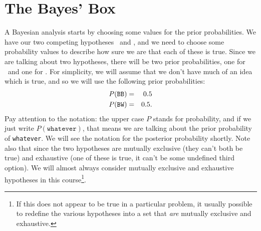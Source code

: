 \section{The Bayes' Box}
A Bayesian analysis starts by choosing some values for the prior probabilities.
We have our two competing hypotheses \bb~and \bw, and we need to choose some
probability values to describe how sure we are that each of these is true.
Since we are talking about two hypotheses, there will be two prior probabilities,
one for \bb~and one for \bw.
For simplicity, we will assume that we don't have much of an idea which is true,
and so we will use the following prior probabilities:
\begin{eqnarray}
P(\texttt{BB}) &=& 0.5\\
P(\texttt{BW}) &=& 0.5.
\end{eqnarray}
Pay attention to the notation: the upper case $P$ stands for probability, and if we just
write $P(\texttt{whatever})$, that means we are talking about the
prior probability of {\tt whatever}. We will see the notation for the posterior probability
shortly. Note also that since the two hypotheses are mutually exclusive
(they can't both be true) and exhaustive (one of these is true, it can't be
some undefined third option).
We will almost always consider mutually exclusive and exhaustive hypotheses in
this course\footnote{If this does not appear to be true in a particular problem,
it usually possible to redefine the various hypotheses into a set that {\it are}
mutually exclusive and exhaustive.}.

